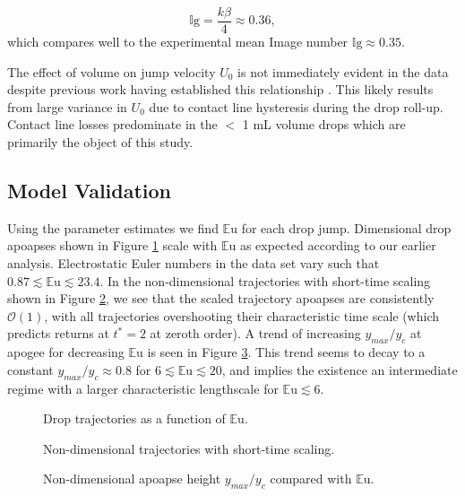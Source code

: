 \documentclass[aip,reprint, floatfix]{revtex4-1}
\begin{document}
\begin{equation*}
\mathbb{I}\mbox{g} = \frac{k \beta}{4} \approx 0.36,
\end{equation*}
which compares well to the experimental mean Image number $\mathbb{I}\mbox{g} \approx 0.35$.

The effect of volume on jump velocity $U_0$ is not immediately evident in the data despite previous work having established this relationship \cite{attari_puddle_2016}. This likely results from large variance in $U_0$ due to contact line hysteresis during the drop roll-up. Contact line losses predominate in the $<$ 1 mL volume drops which are primarily the object of this study.  

\subsection{Model Validation}
Using the parameter estimates we find $\mathbb{E}\mbox{u}$ for each drop jump. Dimensional drop apoapses shown in Figure \ref{fig:series_s_eu} scale with $\mathbb{E}\mbox{u}$ as expected according to our earlier analysis. Electrostatic Euler numbers in the data set vary such that $0.87 \lesssim \mathbb{E}\mbox{u} \lesssim 23.4$. In the non-dimensional trajectories with short-time scaling shown in Figure \ref{fig:series_s_ds}, we see that the scaled trajectory apoapses are consistently $\mathcal{O}(1)$, with all trajectories overshooting their characteristic time scale (which predicts returns at $t^*  =2$ at zeroth order). A trend of increasing $y_{max}/y_c$ at apogee for decreasing $\mathbb{E}\mbox{u}$ is seen in Figure \ref{fig:yscale_trend}. This trend seems to decay to a constant $y_{max}/y_c \approx 0.8$ for $6 \lesssim \mathbb{E}\mbox{u} \lesssim 20$, and implies the existence an intermediate regime with a larger characteristic lengthscale for $\mathbb{E}\mbox{u} \lesssim 6$.
\begin{figure}[!htb]
    \centering
    \resizebox{0.5\textwidth}{!}{}
    \caption{Drop trajectories as a function of $\mathbb{E}\mbox{u}$.\label{fig:series_s_eu}}
\end{figure}
\begin{figure}[htb]
    \centering
    \resizebox{0.5\textwidth}{!}{}
    \caption{Non-dimensional trajectories with short-time scaling.\label{fig:series_s_ds}}
\end{figure}
\begin{figure}[htb]
    \centering
    \resizebox{0.5\textwidth}{!}{}
    \caption{Non-dimensional apoapse height $y_{max}/y_c$ compared with $\mathbb{E}\mbox{u}$.\label{fig:yscale_trend}}
\end{figure}
\end{document}
